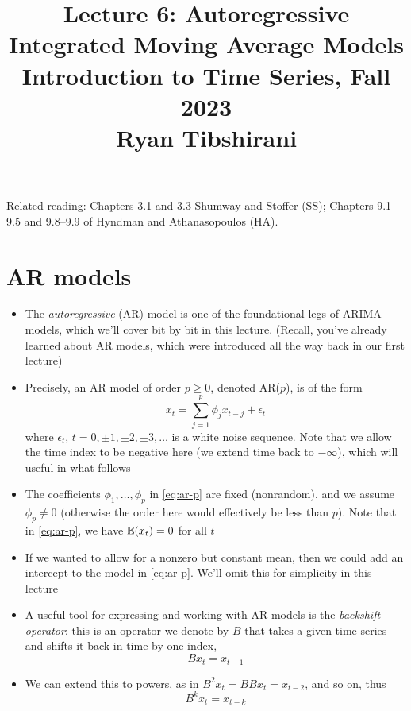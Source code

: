 \documentclass{article}
\title{Lecture 6: Autoregressive Integrated Moving Average Models \\ \smallskip  
\large Introduction to Time Series, Fall 2023 \\ \smallskip
Ryan Tibshirani}
\date{}
\begin{document}
\maketitle
\RaggedRight
\vspace{-50pt}

Related reading: Chapters 3.1 and 3.3 Shumway and Stoffer (SS); Chapters
9.1--9.5 and 9.8--9.9 of Hyndman and Athanasopoulos (HA).   

\section{AR models}

\begin{itemize}
\item The \emph{autoregressive} (AR) model is one of the foundational legs of
  ARIMA models, which we'll cover bit by bit in this lecture. (Recall, you've
  already learned about AR models, which were introduced all the way back in our 
  first lecture)  

\item Precisely, an AR model of order $p \geq 0$, denoted AR($p$), is of the
  form 
  \begin{equation}
  \label{eq:ar-p}
  x_t = \sum_{j=1}^p \phi_j x_{t-j} + \epsilon_t
  \end{equation}
  where $\epsilon_t$, $t = 0, \pm 1, \pm 2, \pm 3, \dots$ is a white noise
  sequence. Note that we allow the time index to be negative here (we extend
  time back to $-\infty$), which will useful in what follows

\item The coefficients $\phi_1,\dots,\phi_p$ in \eqref{eq:ar-p} are fixed
  (nonrandom), and we assume $\phi_p \not= 0$ (otherwise the order here would
  effectively be less than $p$). Note that in \eqref{eq:ar-p}, we have $\mathbb{E}(x_t)
  = 0$ for all $t$

\item If we wanted to allow for a nonzero but constant mean, then we could add
  an intercept to the model in \eqref{eq:ar-p}. We'll omit this for simplicity
  in this lecture  

\item A useful tool for expressing and working with AR models is the
  \emph{backshift operator}: this is an operator we denote by $B$ that takes a 
  given time series and shifts it back in time by one index,
  \[
  B x_t = x_{t-1}
  \]

\item We can extend this to powers, as in $B^2 x_t = B B x_t = x_{t-2}$, and so
  on, thus   
  \[
  B^k x_t = x_{t-k} 
  \]


\end{itemize}
\end{document}

